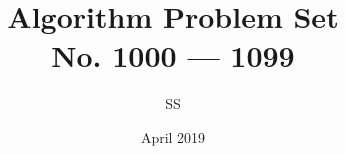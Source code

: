 \documentclass[a4paper,12pt]{article}
\title{Algorithm Problem Set \\ \large No. 1000 --- 1099}
\author{SS}
\date{April 2019}
\begin{document}
\def\bottom#1#2{\hbox{\vbox to #1{\vfill\hbox{#2}}}}
\renewcommand{\thelstlisting}{\thesection.\arabic{lstlisting}}
\sloppy
\maketitle

%
%
%
%
%
%
%
%
%
%
%
%
%
%
%
%
%
%
%
%
%
%
%
%
%
%
%
%
%
%
%
%
%
%
%
%
%
%
%
%
%
%

%
%
%
%
%
%
%
%
%
%
%
%
%
%
%
%
%
%
%
%
%
%
%
%
%
%
%
%
%
%
%
%
%
%
%
%
%
%
%
%
%
%
%
%
%
%
%
%
%
%
%
%
%
%
%
%
\end{document}

